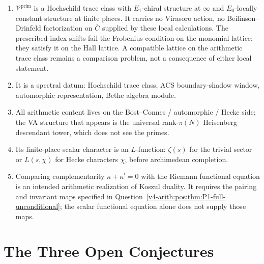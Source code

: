 \begin{remark}
\begin{enumerate}
\item \(\mathcal{V}^{\mathrm{prim}}\) is a Hochschild trace class
with \(E_{1}\)-chiral structure at \(\infty\) and \(E_{0}\)-locally
constant structure at finite places. It carries no Virasoro action,
no Beilinson--Drinfeld factorization on \(\overline C\) supplied by
these local calculations. The prescribed index shifts fail the Frobenius
condition on the monomial lattice; they satisfy it on the Hall lattice.
A compatible lattice on the arithmetic trace class remains a comparison
problem, not a consequence of either local statement.
\item It is a spectral datum: Hochschild trace class, ACS
boundary-shadow window, automorphic representation, Bethe algebra
module.
\item All arithmetic content lives on the Bost--Connes /
automorphic / Hecke side; the VA structure that appears is the
universal rank-\(\pi(N)\) Heisenberg descendant tower, which does
not see the primes.
\item Its finite-place scalar character is an \(L\)-function:
\(\zeta(s)\) for the trivial sector or \(L(s,\chi)\) for Hecke
characters \(\chi\), before archimedean completion.
\item Comparing complementarity \(\kappa+\kappa^{!}=0\) with the
Riemann functional equation is an intended arithmetic realization of
Koszul duality. It requires the pairing and invariant maps specified
in Question~\ref{v4-arith:pos:thm:P1-full-unconditional}; the scalar functional
equation alone does not supply those maps.
\end{enumerate}
\end{remark}

\section{The Three Open Conjectures}
\label{v4-arith:syn:three-open-conjectures}

